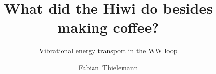\documentclass[english]{beamer}
\title[VET in WW]{What did the Hiwi do besides making coffee?}
\subtitle{Vibrational energy transport in the WW loop}
\author[F.~Thielemann]{Fabian~Thielemann}
\institute{Institute of Physics\\Department of Biomolecular Dynamics}
\newcommand{\backupbegin}{
   \newcounter{framenumberappendix}
   \setcounter{framenumberappendix}{\value{framenumber}}
}
\newcommand{\backupend}{
  \addtocounter{framenumberappendix}{-\value{framenumber}}
  \addtocounter{framenumber}{\value{framenumberappendix}} 
}
\begin{document}
  \begin{frame}[t]
    \titlepage
  \end{frame}

  
  
  
  
  
  
  
\end{document}

